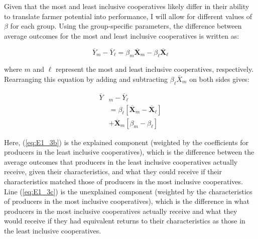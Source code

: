\documentclass[11pt]{article}
\begin{document}
Given that the most and least inclusive cooperatives likely differ in their ability to translate farmer potential into performance, I will allow for different values of $\beta$ for each group. Using the group-specific parameters, the difference between average outcomes for the most and least inclusive cooperatives is written as:

\begin{equation} \label{eq:E1_2}
        \overline{Y}_{m} - \overline{Y}_{\ell} =  \beta_{m}\overline{\mathbf{X}}_{m} - \beta_{\ell}\overline{\mathbf{X}}_{\ell}
\end{equation}  

where $m$ and $\ell$ represent the most and least inclusive cooperatives, respectively. Rearranging this equation by adding and subtracting $\beta_{\ell}\overline{X}_{m}$ on both sides gives:

\begin{subequations}
    \begin{align}
        \overline{Y}&_{m} - \overline{Y}_{\ell} \label{eq:E1_3a} \\
                &= \beta_{\ell}[\overline{\mathbf{X}}_{m} - \overline{\mathbf{X}}_{\ell}] \label{eq:E1_3b} \\
                &+ \overline{\mathbf{X}}_{m}[\beta_{m} - \beta_{\ell}] \label{eq:E1_3c}
    \end{align}
\end{subequations}  

Here, (\ref{eq:E1_3b}) is the explained component (weighted by the coefficients for producers in the least inclusive cooperatives), which is the difference between the average outcomes that producers in the least inclusive cooperatives actually receive, given their characteristics, and what they could receive if their characteristics matched those of producers in the most inclusive cooperatives. %
Line (\ref{eq:E1_3c}) is the unexplained component (weighted by the characteristics of producers in the most inclusive cooperatives), which is the difference in what producers in the most inclusive cooperatives actually receive and what they would receive if they had equivalent returns to their characteristics as those in the least inclusive cooperatives.
\end{document}
